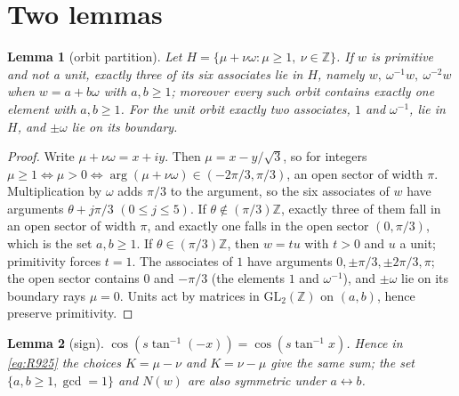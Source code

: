 \documentclass[11pt]{article}
\newtheorem{lemma}{Lemma}
\theoremstyle{remark}
\begin{document}
\section{Two lemmas}
\begin{lemma}[orbit partition]\label{lem:orbit}
Let $H=\{\mu+\nu\omega:\mu\ge1,\ \nu\in\mathbb Z\}$. If $w$ is primitive and not a unit, exactly three of its six associates lie in $H$,
namely $w,\ \omega^{-1}w,\ \omega^{-2}w$ when $w=a+b\omega$ with $a,b\ge1$; moreover every such orbit contains exactly one element
with $a,b\ge1$. For the unit orbit exactly two associates, $1$ and $\omega^{-1}$, lie in $H$, and $\pm\omega$ lie on its boundary.
\end{lemma}
\begin{proof}
Write $\mu+\nu\omega=x+iy$. Then $\mu=x-y/\sqrt3$, so for integers $\mu\ge1\iff\mu>0\iff\arg(\mu+\nu\omega)\in(-2\pi/3,\pi/3)$,
an open sector of width $\pi$. Multiplication by $\omega$ adds $\pi/3$ to the argument, so the six associates of $w$ have arguments
$\theta+j\pi/3$ $(0\le j\le5)$. If $\theta\notin(\pi/3)\mathbb Z$, exactly three of them fall in an open sector of width $\pi$, and exactly
one falls in the open sector $(0,\pi/3)$, which is the set $a,b\ge1$. If $\theta\in(\pi/3)\mathbb Z$, then $w=tu$ with $t>0$ and $u$
a unit; primitivity forces $t=1$. The associates of $1$ have arguments $0,\pm\pi/3,\pm2\pi/3,\pi$; the open sector contains $0$ and
$-\pi/3$ (the elements $1$ and $\omega^{-1}$), and $\pm\omega$ lie on its boundary rays $\mu=0$. Units act by matrices in
$\mathrm{GL}_2(\mathbb Z)$ on $(a,b)$, hence preserve primitivity.
\end{proof}

\begin{lemma}[sign]\label{lem:sign}
$\cos(s\tan^{-1}(-x))=\cos(s\tan^{-1}x)$. Hence in \eqref{eq:R925} the choices $K=\mu-\nu$ and $K=\nu-\mu$ give the same sum; the
set $\{a,b\ge1,\gcd=1\}$ and $N(w)$ are also symmetric under $a\leftrightarrow b$.
\end{lemma}
\end{document}
